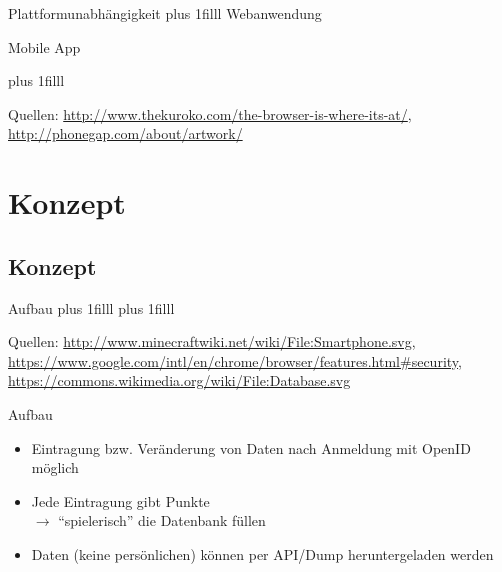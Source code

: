 \documentclass{beamer}
\begin{document}
\begin{frame}{Plattformunabhängigkeit}
	\vskip0pt plus 1filll
	Webanwendung

	\begin{center}
	\end{center}

	Mobile App

	\begin{center}
	\end{center}
	\vskip0pt plus 1filll
	\par\hrulefill\par
	\tiny{Quellen:
			\url{http://www.thekuroko.com/the-browser-is-where-its-at/},
	\url{http://phonegap.com/about/artwork/}}
\end{frame}

\section{Konzept}
\subsection*{Konzept}
\begin{frame}{Aufbau}
	\vskip0pt plus 1filll
	\vskip0pt plus 1filll
	\par\hrulefill\par
	\tiny{Quellen:
	\url{http://www.minecraftwiki.net/wiki/File:Smartphone.svg},
	\url{https://www.google.com/intl/en/chrome/browser/features.html\#security},
	\url{https://commons.wikimedia.org/wiki/File:Database.svg}}
\end{frame}

\begin{frame}{Aufbau}
	\begin{itemize}
		\item Eintragung bzw. Veränderung von Daten nach Anmeldung mit
				OpenID möglich
		\item Jede Eintragung gibt Punkte\\
			$\rightarrow$ ``spielerisch'' die Datenbank füllen
		\item Daten (keine persönlichen) können per API/Dump
				heruntergeladen werden
	\end{itemize}
\end{frame}
\end{document}
